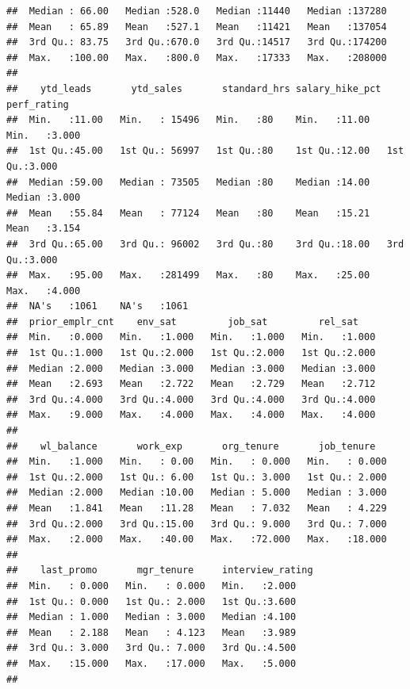 \documentclass[
]{book}
\begin{document}
\begin{verbatim}
##  Median : 66.00   Median :528.0   Median :11440   Median :137280  
##  Mean   : 65.89   Mean   :527.1   Mean   :11421   Mean   :137054  
##  3rd Qu.: 83.75   3rd Qu.:670.0   3rd Qu.:14517   3rd Qu.:174200  
##  Max.   :100.00   Max.   :800.0   Max.   :17333   Max.   :208000  
##                                                                   
##    ytd_leads       ytd_sales       standard_hrs salary_hike_pct  perf_rating   
##  Min.   :11.00   Min.   : 15496   Min.   :80    Min.   :11.00   Min.   :3.000  
##  1st Qu.:45.00   1st Qu.: 56997   1st Qu.:80    1st Qu.:12.00   1st Qu.:3.000  
##  Median :59.00   Median : 73505   Median :80    Median :14.00   Median :3.000  
##  Mean   :55.84   Mean   : 77124   Mean   :80    Mean   :15.21   Mean   :3.154  
##  3rd Qu.:65.00   3rd Qu.: 96002   3rd Qu.:80    3rd Qu.:18.00   3rd Qu.:3.000  
##  Max.   :95.00   Max.   :281499   Max.   :80    Max.   :25.00   Max.   :4.000  
##  NA's   :1061    NA's   :1061                                                  
##  prior_emplr_cnt    env_sat         job_sat         rel_sat     
##  Min.   :0.000   Min.   :1.000   Min.   :1.000   Min.   :1.000  
##  1st Qu.:1.000   1st Qu.:2.000   1st Qu.:2.000   1st Qu.:2.000  
##  Median :2.000   Median :3.000   Median :3.000   Median :3.000  
##  Mean   :2.693   Mean   :2.722   Mean   :2.729   Mean   :2.712  
##  3rd Qu.:4.000   3rd Qu.:4.000   3rd Qu.:4.000   3rd Qu.:4.000  
##  Max.   :9.000   Max.   :4.000   Max.   :4.000   Max.   :4.000  
##                                                                 
##    wl_balance       work_exp       org_tenure       job_tenure    
##  Min.   :1.000   Min.   : 0.00   Min.   : 0.000   Min.   : 0.000  
##  1st Qu.:2.000   1st Qu.: 6.00   1st Qu.: 3.000   1st Qu.: 2.000  
##  Median :2.000   Median :10.00   Median : 5.000   Median : 3.000  
##  Mean   :1.841   Mean   :11.28   Mean   : 7.032   Mean   : 4.229  
##  3rd Qu.:2.000   3rd Qu.:15.00   3rd Qu.: 9.000   3rd Qu.: 7.000  
##  Max.   :2.000   Max.   :40.00   Max.   :72.000   Max.   :18.000  
##                                                                   
##    last_promo       mgr_tenure     interview_rating
##  Min.   : 0.000   Min.   : 0.000   Min.   :2.000   
##  1st Qu.: 0.000   1st Qu.: 2.000   1st Qu.:3.600   
##  Median : 1.000   Median : 3.000   Median :4.100   
##  Mean   : 2.188   Mean   : 4.123   Mean   :3.989   
##  3rd Qu.: 3.000   3rd Qu.: 7.000   3rd Qu.:4.500   
##  Max.   :15.000   Max.   :17.000   Max.   :5.000   
## 
\end{verbatim}
\end{document}
